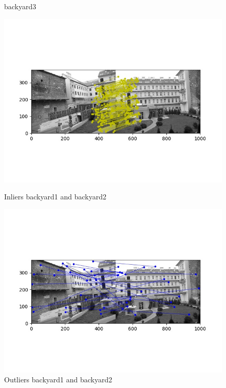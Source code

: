 \documentclass[12pt,a4paper]{report}
\begin{document}
\begin{figure}[!htb]
    \caption{backyard3}
\endminipage
\end{figure}

\begin{figure}[!htb]
  \includegraphics[width=\linewidth]{outMatches_inlier_backyard1}
      \caption{Inliers backyard1 and backyard2}
\endminipage\hfill
{}
  \includegraphics[width=\linewidth]{outMatches_outlier_backyard1}
      \caption{Outliers backyard1 and backyard2}
\endminipage\hfill
\end{figure}
\end{document}

